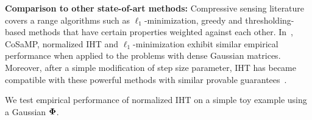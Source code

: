 \documentclass{article}
\newtheorem{theorem}{Theorem}
\begin{document}

{\bf Comparison to other state-of-art methods:} Compressive sensing literature covers a range algorithms such as $\ell_1$-minimization, greedy and thresholding-based methods that have certain properties weighted against each other. In~\cite{blumensath2010niht}, CoSaMP, normalized IHT and $\ell_1$-minimization exhibit similar empirical performance when applied to the problems with dense Gaussian matrices. Moreover, after a simple modification of step size parameter, IHT has became compatible with these powerful methods with similar provable guarantees~\cite{blumensath2012greedy}. 

We test empirical performance of normalized IHT on a simple toy example using a Gaussian ${\bf \Phi}$. 
\end{document}
